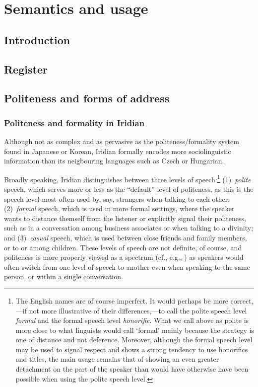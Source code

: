 \chapter{Semantics and usage}

\section{Introduction}



\section{Register}
\section{Politeness and forms of address}\label{sec:politaddr}

\subsection{Politeness and formality in Iridian}

Although not as complex and as pervasive as the politeness/formality system
found in Japanese or Korean, Iridian formally
encodes more sociolinguistic information than its neigbouring
languages such as Czech or Hungarian.

Broadly speaking, Iridian distinguishes between three levels of
speech:\footnote{ The English names are of course
imperfect. It would perhaps be more correct,---if not more illustrative of their
differences,---to call the polite speech level \emph{formal} and the formal
speech level \emph{honorific}. What we call above as polite is more close to
what linguists would call `formal' mainly because the strategy is one of
distance and not deference. Moreover, although the formal speech level may be
used to signal respect and shows a strong tendency to use honorifics and titles,
the main usage remains that of showing an even greater detachment on the part of
the speaker than would have otherwise have been possible when using the polite
speech level. } (1)~\emph{polite} speech, which serves more or less as the
``default'' level of politeness, as this is the speech level most often used by,
say, strangers when talking to each other; (2)~\emph{formal} speech, which is
used in more formal settings, where the speaker wants to distance themself from
the listener or explicitly signal their politeness, such as in a conversation
among business associates or when talking to a divinity; and (3)~\emph{casual}
speech, which is used between close friends and family members, or to or among
children. These levels of speech are not definite, of course, and politeness is
more properly viewed as a spectrum (cf., e.g., \cite{hansonjap}) as speakers
would often switch from one level of speech to another even when speaking to the
same person, or within a single conversation.

